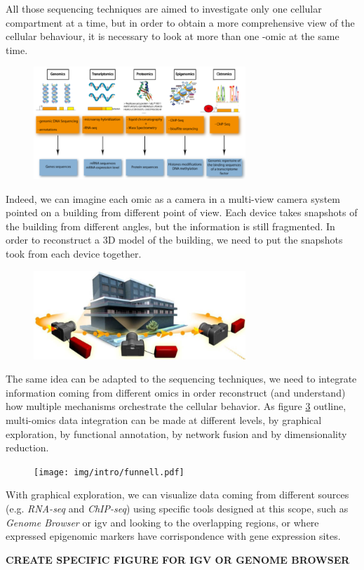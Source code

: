 All those sequencing techniques are aimed to investigate only one cellular compartment at a time, but in order to obtain a more comprehensive view of the cellular behaviour, it is necessary to look at more than one -omic at the same time.

\begin{figure}[h]
\centering
\includegraphics[width=8cm, keepaspectratio]{img/intro/omics.png}
\caption[Omics Representation]{}
\label{fig:omics}
\end{figure}

Indeed, we can imagine each omic as a camera in a multi-view camera system pointed on a building from different point of view.
Each device takes snapshots of the building from different angles, but the information is still fragmented.
In order to reconstruct a 3D model of the building, we need to put the snapshots took from each device together.

\begin{figure}[h]
\centering
\includegraphics[width=8cm, keepaspectratio]{img/intro/cameras.png}
\caption[Integration cameras]{}
\label{fig:cameras}
\end{figure}

The same idea can be adapted to the sequencing techniques, we need to integrate information coming from different omics in order reconstruct (and understand) how multiple mechanisms orchestrate the cellular behavior.
As figure \ref{fig:funnell} outline, multi-omics data integration can be made at different levels, by graphical exploration, by functional annotation, by network fusion and by dimensionality reduction.

\begin{figure}[h]
\centering
\texttt{[image: img/intro/funnell.pdf]}
\caption[Integration Funnell]{}
\label{fig:funnell}
\end{figure}

With graphical exploration, we can visualize data coming from different sources (e.g. \textit{RNA-seq} and \textit{ChIP-seq}) using specific tools designed at this scope, such as \textit{Genome Browser} \cite{Karolchik2011} or \gls{igv} \cite{Robinson2011, Thorvaldsdottir2013} and looking to the overlapping regions, or where expressed epigenomic markers have corrispondence with gene expression sites.


\textbf{CREATE SPECIFIC FIGURE FOR IGV OR GENOME BROWSER}




